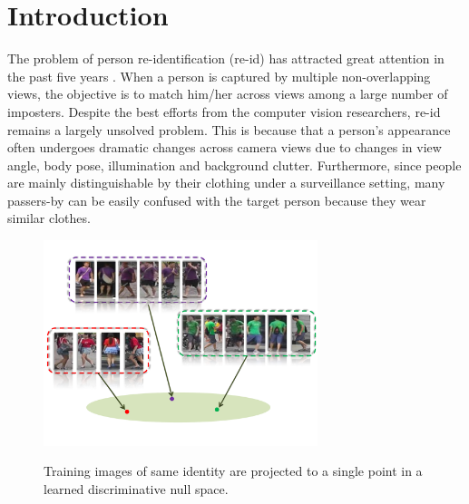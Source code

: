 \documentclass[10pt,twocolumn,letterpaper]{article}
\begin{document}
\section{Introduction}
The problem of person re-identification (re-id) has attracted great attention in the past five years \cite{Vezzan_survey,Gong_book_re-id}. When a person is captured by multiple non-overlapping views, the objective is to match him/her across views among a large number of imposters. Despite the best efforts from the computer vision researchers, re-id remains a largely unsolved problem. This is because that a person's appearance often undergoes dramatic changes across camera views due to changes in view angle, body pose, illumination and background clutter. Furthermore, since people are mainly distinguishable by their clothing under a surveillance setting, many passers-by can be easily confused with the target person because they wear similar clothes.


		\begin{figure}[H]
	\centering
		\includegraphics[height=6cm]{nullspace.pdf}
		\label{fig:null space}
		\vspace{-0.3cm}
		\caption{Training images of same identity are projected to a single point in a learned discriminative null space. %
		}
	\end{figure}
\end{document}
